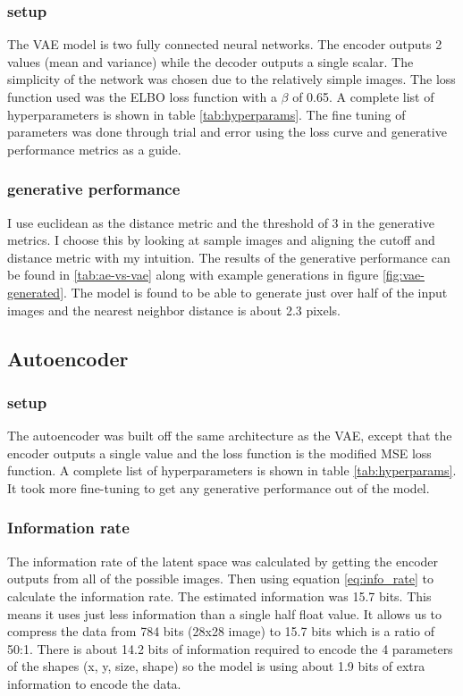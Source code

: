 \documentclass[conference,a4paper]{IEEEtran}
\begin{document}
\subsubsection{setup}

The VAE model is two fully connected neural networks. The encoder outputs 2 values (mean and variance) while the decoder outputs a single scalar. The simplicity of the network was chosen due to the relatively simple images. The loss function used was the ELBO loss function with a $\beta$ of 0.65. A complete list of hyperparameters is shown in table \ref{tab:hyperparams}. The fine tuning of parameters was done through trial and error using the loss curve and generative performance metrics as a guide.

\subsubsection{generative performance}

I use euclidean as the distance metric and the threshold of 3 in the generative metrics. I choose this by looking at sample images and aligning the cutoff and distance metric with my intuition. The results of the generative performance can be found in \ref{tab:ae-vs-vae} along with example generations in figure \ref{fig:vae-generated}. The model is found to be able to generate just over half of the input images and the nearest neighbor distance is about 2.3 pixels.

\subsection{Autoencoder}

\subsubsection{setup}
The autoencoder was built off the same architecture as the VAE, except that the encoder outputs a single value and the loss function is the modified MSE loss function. A complete list of hyperparameters is shown in table \ref{tab:hyperparams}. It took more fine-tuning to get any generative performance out of the model.

\subsubsection{Information rate}

The information rate of the latent space was calculated by getting the encoder outputs from all of the possible images. Then using equation \ref{eq:info_rate} to calculate the information rate. The estimated information was 15.7 bits. This means it uses just less information than a single half float value. It allows us to compress the data from 784 bits (28x28 image) to 15.7 bits which is a ratio of 50:1. There is about 14.2 bits of information required to encode the 4 parameters of the shapes (x, y, size, shape) so the model is using about 1.9 bits of extra information to encode the data.
\end{document}
